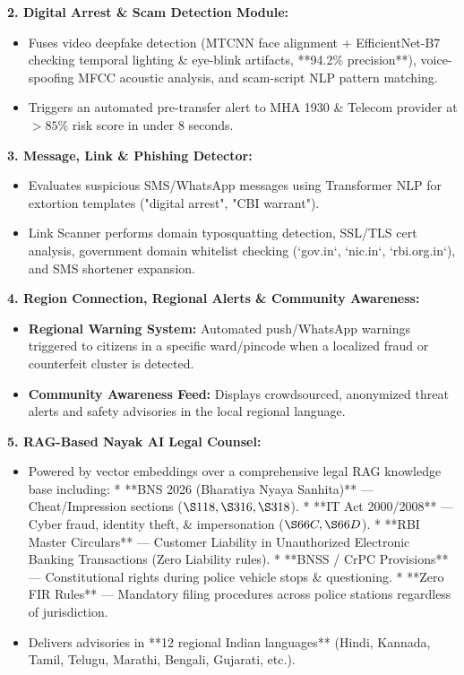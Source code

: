 \documentclass[10pt]{article}
\begin{document}
\textbf{2. Digital Arrest \& Scam Detection Module:}
\begin{itemize}[leftmargin=12pt,topsep=1pt,itemsep=1pt]
\item Fuses video deepfake detection (MTCNN face alignment + EfficientNet-B7 checking temporal lighting \& eye-blink artifacts, **94.2\% precision**), voice-spoofing MFCC acoustic analysis, and scam-script NLP pattern matching.
\item Triggers an automated pre-transfer alert to MHA 1930 \& Telecom provider at $>85\%$ risk score in under 8 seconds.
\end{itemize}

\textbf{3. Message, Link \& Phishing Detector:}
\begin{itemize}[leftmargin=12pt,topsep=1pt,itemsep=1pt]
\item Evaluates suspicious SMS/WhatsApp messages using Transformer NLP for extortion templates ("digital arrest", "CBI warrant").
\item Link Scanner performs domain typosquatting detection, SSL/TLS cert analysis, government domain whitelist checking (`gov.in`, `nic.in`, `rbi.org.in`), and SMS shortener expansion.
\end{itemize}

\textbf{4. Region Connection, Regional Alerts \& Community Awareness:}
\begin{itemize}[leftmargin=12pt,topsep=1pt,itemsep=1pt]
\item \textbf{Regional Warning System:} Automated push/WhatsApp warnings triggered to citizens in a specific ward/pincode when a localized fraud or counterfeit cluster is detected.
\item \textbf{Community Awareness Feed:} Displays crowdsourced, anonymized threat alerts and safety advisories in the local regional language.
\end{itemize}

\textbf{5. RAG-Based Nayak AI Legal Counsel:}
\begin{itemize}[leftmargin=12pt,topsep=1pt,itemsep=1pt]
\item Powered by vector embeddings over a comprehensive legal RAG knowledge base including:
  * **BNS 2026 (Bharatiya Nyaya Sanhita)** --- Cheat/Impression sections ($\S118, \S316, \S318$).
  * **IT Act 2000/2008** --- Cyber fraud, identity theft, \& impersonation ($\S66C, \S66D$).
  * **RBI Master Circulars** --- Customer Liability in Unauthorized Electronic Banking Transactions (Zero Liability rules).
  * **BNSS / CrPC Provisions** --- Constitutional rights during police vehicle stops \& questioning.
  * **Zero FIR Rules** --- Mandatory filing procedures across police stations regardless of jurisdiction.
\item Delivers advisories in **12 regional Indian languages** (Hindi, Kannada, Tamil, Telugu, Marathi, Bengali, Gujarati, etc.).
\end{itemize}
\normalsize
\end{document}
